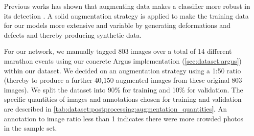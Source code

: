 Previous works has shown that augmenting data makes a classifier more robust in its detection \citep{Yaeger:1996tq,Baird:1992ih,Wong:2016cv}. A solid augmentation strategy is applied to make the training data for our models more extensive and variable by generating deformations and defects and thereby producing synthetic data.

For our network, we manually tagged 803 images over a total of 14 different marathon events using our concrete Argus implementation (\cref{sec:dataset:argus}) within our dataset. We decided on an augmentation strategy using a 1:50 ratio (thereby to produce a further 40,150 augmented images from these original 803 images). We split the dataset into 90\% for training and 10\% for validation. The specific quantities of images and annotations chosen for training and validation are described in \cref{tab:dataset:postprocessing:augmentation_quantities}. An annotation to image ratio less than 1 indicates there were more crowded photos in the sample set.

\begin{table}[t]
\centering
\caption[Breakdown of training and validation data]{Breakdown of images and annotations (runners) used for training and validation.}
\label{tab:dataset:postprocessing:augmentation_quantities}
\end{table}

